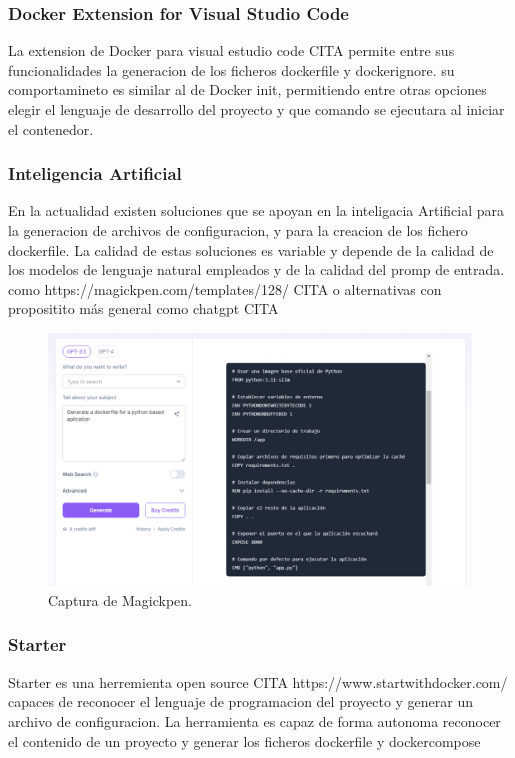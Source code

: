 \documentclass[12pt, a4paper, twoside]{article}
\begin{document}
\subsubsection{Docker Extension for Visual Studio Code}
La extension de Docker para visual estudio code CITA permite entre sus funcionalidades la generacion de los ficheros dockerfile y dockerignore.
su comportamineto es similar al de Docker init, permitiendo entre otras opciones elegir el lenguaje de desarrollo del proyecto y que comando se ejecutara al iniciar el contenedor.
\subsubsection{Inteligencia Artificial}
En la actualidad existen soluciones que se apoyan en la inteligacia Artificial para la generacion de archivos de configuracion, y para la creacion de los fichero dockerfile. 
La calidad de estas soluciones es variable y depende de la calidad de los modelos de lenguaje natural empleados y de la calidad del promp de entrada.
como https://magickpen.com/templates/128/ CITA o alternativas con propositito más general como chatgpt CITA

\begin{figure}[ht]
	\centering
	  \includegraphics[width=1\textwidth]{MagickPen.png}
	\caption{Captura de Magickpen.}
  \end{figure}

\subsubsection{Starter}
Starter es una herremienta open source CITA https://www.startwithdocker.com/ capaces de reconocer el lenguaje de programacion del proyecto y generar un archivo de configuracion. 
La herramienta es capaz de forma autonoma reconocer el contenido de un proyecto y generar los ficheros dockerfile y dockercompose
\end{document}
